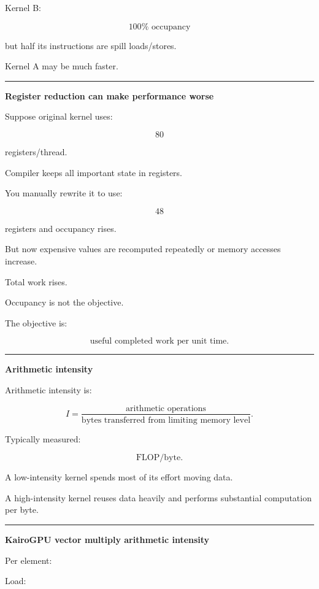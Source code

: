 Kernel B:

\[
100\%\text{ occupancy}
\]

but half its instructions are spill loads/stores.

Kernel A may be much faster.

\begin{center}\rule{0.5\linewidth}{0.5pt}\end{center}

\textbf{Register reduction can make performance worse}

Suppose original kernel uses:

\[
80
\]

registers/thread.

Compiler keeps all important state in registers.

You manually rewrite it to use:

\[
48
\]

registers and occupancy rises.

But now expensive values are recomputed repeatedly or memory accesses increase.

Total work rises.

Occupancy is not the objective.

The objective is:

\[
\boxed{
\text{useful completed work per unit time}.
}
\]

\begin{center}\rule{0.5\linewidth}{0.5pt}\end{center}

\textbf{Arithmetic intensity}

Arithmetic intensity is:

\[
\boxed{
I=
\frac{
\text{arithmetic operations}
}{
\text{bytes transferred from limiting memory level}
}.
}
\]

Typically measured:

\[
\text{FLOP/byte}.
\]

A low-intensity kernel spends most of its effort moving data.

A high-intensity kernel reuses data heavily and performs substantial computation per byte.

\begin{center}\rule{0.5\linewidth}{0.5pt}\end{center}

\textbf{KairoGPU vector multiply arithmetic intensity}

Per element:

Load:

